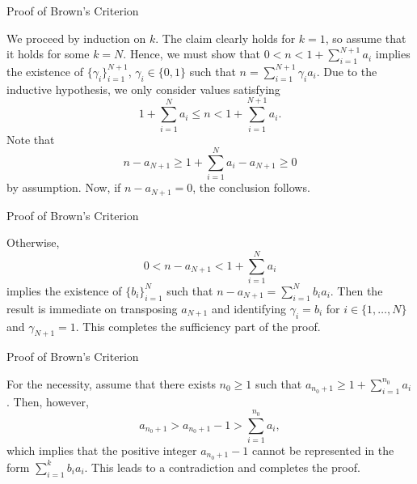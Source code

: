 \documentclass{beamer}
\begin{document}
\begin{frame}{Proof of Brown's Criterion}
	
	We proceed by induction on $k$. The claim clearly holds for $k = 1$, so assume that it holds for some $k = N$. Hence, we must show that $0 < n < 1 +   \sum_{i = 1}^{N + 1}{a_i}$ implies the existence of $\{\gamma_i\}^{N + 1}_{i =1}$, $\gamma_i \in \{0, 1\}$ such that $n = \sum_{i = 1}^{N + 1}{\gamma_i a_i}$. Due to the inductive hypothesis, we only consider values satisfying
	\begin{equation}
	    1 + \sum_{i = 1}^{N}{a_i} \leq n < 1 + \sum_{i = 1}^{N + 1}{a_i}. \nonumber
	\end{equation}
	Note that
	\begin{equation}
	    n-a_{N + 1} \geq 1 + \sum_{i = 1}^{N}{a_i - a_{N + 1}} \geq 0 \nonumber
	\end{equation}
    by assumption. Now, if $n - a_{N + 1} = 0$, the conclusion follows. 
    
\end{frame}
\begin{frame}{Proof of Brown's Criterion}
    
    Otherwise,
    \begin{equation}
        0 < n - a_{N + 1} < 1 + \sum_{i = 1}^{N}{a_i} \nonumber
    \end{equation}
    implies the existence of $\{b_i\}_{i = 1}^{N}$ such that $n - a_{N + 1} = \sum_{i = 1}^{N}{b_i a_i}$. Then the result is immediate on transposing $a_{N + 1}$ and identifying $\gamma_i = b_i$ for $i \in \{1, \ldots, N\}$ and $\gamma_{N + 1} = 1$. This completes the sufficiency part of the proof.
    
\end{frame}
\begin{frame}{Proof of Brown's Criterion}
    
    For the necessity, assume that there exists $n_0 \geq 1$ such that $a_{n_0 + 1} \geq 1 + \sum_{i = 1}^{n_0} a_i$. Then, however, \begin{equation}
        a_{n_0 + 1} > a_{n_0 + 1} - 1 > \sum_{i = 1}^{n_0} a_i, \nonumber
    \end{equation}
    which implies that the positive integer $a_{n_0 + 1} - 1$ cannot be represented in the form $\sum_{i = 1}^{k}{b_i a_i}$. This leads to a contradiction and completes the proof.
\end{frame}
\end{document}
